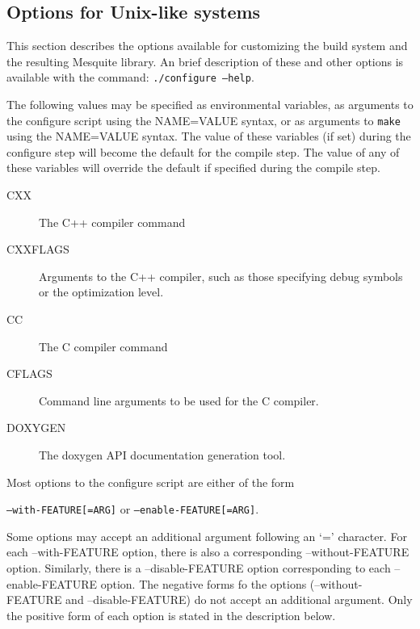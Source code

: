 \subsection{Options for Unix-like systems}
This section describes the options available for customizing the build
system and the resulting Mesquite library.  An brief description of these
and other options is available with the command: \texttt{./configure --help}.

\label{mes_vars_and_defs}
The following values may be specified as environmental variables, as arguments
to the configure script using the NAME=VALUE syntax, or as arguments to \texttt{make}
using the NAME=VALUE syntax.  The value of these variables (if set) during the
configure step will become the default for the compile step.  The value of any
of these variables will override the default if specified during the compile
step.
\begin{description}
\item[CXX]       The C++ compiler command
\item[CXXFLAGS]  Arguments to the C++ compiler, such as those specifying 
debug symbols or the optimization level.
\item[CC]        The C compiler command
\item[CFLAGS]    Command line arguments to be used for the C compiler.
\item[DOXYGEN]   The doxygen API documentation generation tool.
\end{description}

Most options to the configure script are either of the form 
\begin{center}
\texttt{--with-FEATURE[=ARG]} or \texttt{--enable-FEATURE[=ARG]}.
\end{center}
Some options may accept an additional argument following 
an `=' character.  For each --with-FEATURE option, there is also a corresponding
--without-FEATURE option.  Similarly, there is a --disable-FEATURE option 
corresponding to each --enable-FEATURE option.  The negative forms fo the options 
(--without-FEATURE and --disable-FEATURE) do not accept an additional argument.  
Only the positive form of each option is stated in the description below.  

